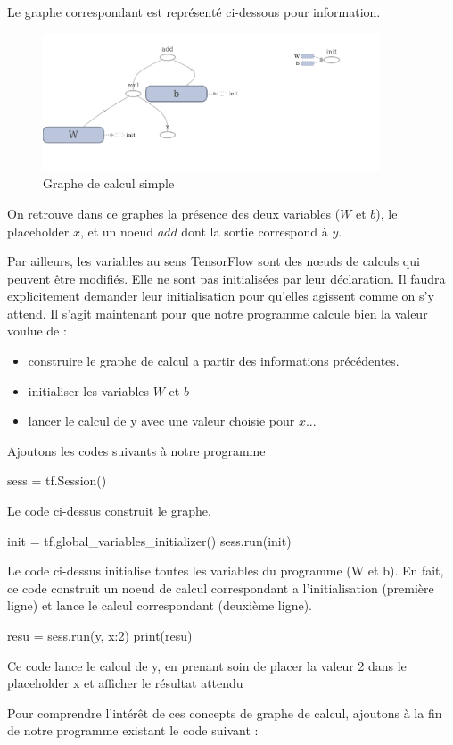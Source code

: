\documentclass[a4paper,11pt]{book}
\theoremstyle{theo}
\begin{document}
Le graphe correspondant est représenté ci-dessous pour information.
\begin{figure}[H]

\begin{center}
\includegraphics[width=10cm]{./figures/graph_addition.png} 
\end{center}
\caption{Graphe de calcul simple}
\end{figure}

On retrouve dans ce graphes la présence des deux variables ($W$ et $b$), le placeholder $x$, et un noeud $add$ dont la sortie correspond à $y$.


Par ailleurs, les variables au sens TensorFlow sont des nœuds de calculs qui peuvent être modifiés. Elle ne sont pas initialisées par leur déclaration. Il faudra explicitement demander leur initialisation pour qu'elles agissent comme on s'y attend.
Il s'agit maintenant pour que notre programme calcule bien la valeur voulue de :
\begin{itemize}
\item construire le graphe de calcul a partir des informations précédentes.
\item initialiser les variables $W$ et $b$
\item lancer le calcul de y avec une valeur choisie pour $x$...
\end{itemize}

Ajoutons les codes suivants à notre programme
\begin{mypython}
sess = tf.Session()
\end{mypython}
Le code ci-dessus construit le graphe.
\begin{mypython}
init = tf.global_variables_initializer()
sess.run(init)
\end{mypython}
Le code ci-dessus initialise toutes les variables du programme (W et b). En fait, ce code construit un noeud de calcul correspondant a l'initialisation (première ligne) et lance le calcul correspondant (deuxième ligne).

\begin{mypython} 
resu = sess.run(y, {x:2}) 
print(resu)
\end{mypython}
Ce code lance le calcul de y, en prenant soin de placer la valeur 2 dans le placeholder x et afficher le résultat attendu
\begin{myoutput}
[0.3]
\end{myoutput}
Pour comprendre l'intérêt de ces concepts de graphe de calcul, ajoutons à la fin de notre programme existant le code suivant :
\end{document}
